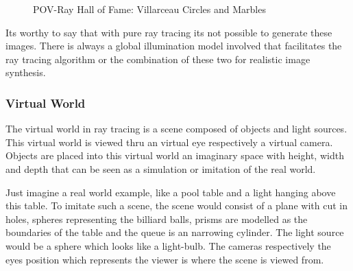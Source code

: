 \documentclass[DIV10, abstracton, openright, footsepline, headsepline, twoside, 9pt,
bigheadings]{scrreprt}
\begin{document}
\begin{figure}[H]
\centering
{}\quad
{}
\caption{POV-Ray Hall of Fame: Villarceau Circles and Marbles}
\label{fig:halloffame}
\end{figure}

Its worthy to say that with pure ray tracing its not possible to generate these
images. There is always a global illumination model involved that
facilitates the ray tracing algorithm or the combination of these two for
realistic image synthesis.

\subsubsection{Virtual World}
The virtual world in ray tracing is a scene composed of objects and light
sources. This virtual world is viewed thru an virtual eye respectively a
virtual camera. Objects are placed into this virtual world an imaginary
space with height, width and depth that can be seen as a simulation or
imitation of the real world.

Just imagine a real world example, like a pool table and a light hanging
above this table. To imitate such a scene, the scene would consist of a plane
with cut in holes, spheres representing the billiard balls, prisms are modelled
as the boundaries of the table and the queue is an narrowing cylinder. The light
source would be a sphere which looks like a light-bulb. The cameras respectively
the eyes position which represents the viewer is where the scene is viewed from.
\end{document}
